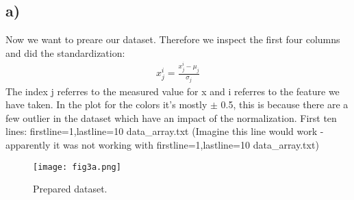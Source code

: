 \subsection{a)}
Now we want to preare our dataset. Therefore we inspect the first four columns and did the standardization:
\begin{align}
    x_j^{i} = \frac{x_j^{i} - \mu_j}{\sigma_j}
\end{align}
The index j referres to the measured value for x and i referres to the feature we have taken. In the plot for the colors it's mostly $\pm$ 0.5, this is because there are a few outlier in the dataset which have an impact of the normalization.
First ten lines: firstline=1,lastline=10 data_array.txt (Imagine this line would work  - apparently it was not working with firstline=1,lastline=10 data_array.txt)

\begin{figure}[h!]
    \centering
    \texttt{[image: fig3a.png]}
    \caption{Prepared dataset.}
\end{figure}




